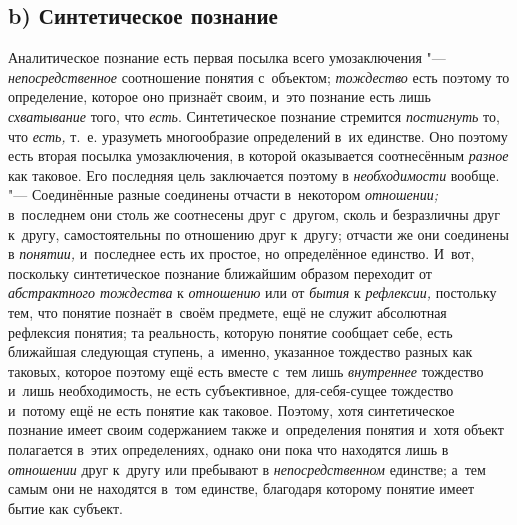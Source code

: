 \subsection[b) Синтетическое познание]{b) Синтетическое познание}

Аналитическое познание есть первая посылка всего
умозаключения "--- {\em непосредственное}
соотношение понятия с~объектом;
{\em тождество} есть
поэтому то определение, которое оно признаёт своим, и~это познание есть
лишь {\em схватывание}
того, что {\em есть}.
Синтетическое познание стремится
{\em постигнуть} то, что
{\em есть,} т.~е.
уразуметь многообразие определений в~их единстве. Оно поэтому есть вторая
посылка умозаключения, в
которой
оказывается соотнесённым
{\em разное} как таковое.
Его последняя цель заключается поэтому в
{\em необходимости}
вообще. "--- Соединённые разные соединены отчасти
в~некотором {\em отношении;}
в~последнем они столь же соотнесены друг с~другом, сколь и
безразличны друг к~другу, самостоятельны по отношению друг к~другу; отчасти
же они соединены в {\em понятии,}
и~последнее есть их простое, но определённое единство. И~вот,
поскольку синтетическое познание ближайшим образом переходит от
{\em абстрактного тождества}
к {\em отношению}
или от {\em бытия}
к {\em рефлексии,}
постольку тем, что понятие познаёт в~своём предмете, ещё не
служит абсолютная рефлексия понятия; та реальность, которую понятие
сообщает себе, есть ближайшая следующая ступень, а~именно, указанное
тождество разных как таковых, которое поэтому ещё есть вместе с~тем лишь
{\em внутреннее}
тождество и~лишь необходимость, не есть субъективное,
для-себя-сущее тождество и~потому ещё не есть понятие как таковое. Поэтому,
хотя синтетическое познание имеет своим содержанием также и~определения
понятия и~хотя объект полагается в~этих определениях, однако они пока что
находятся лишь в {\em отношении}
друг к~другу или пребывают в
{\em непосредственном}
единстве; а~тем самым они не находятся в~том единстве,
благодаря которому понятие имеет бытие как субъект.

